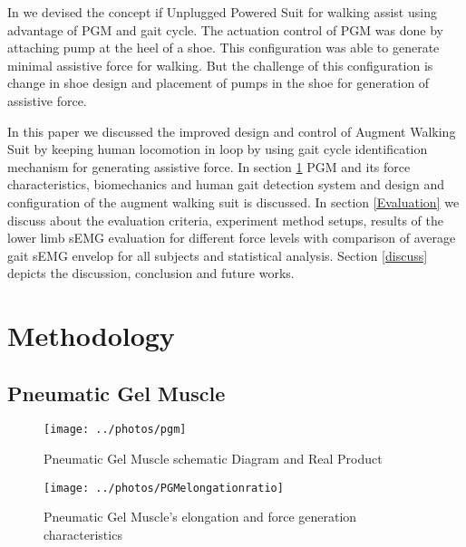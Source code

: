 \documentclass[letterpaper, 10 pt, conference]{ieeeconf}  %
\begin{document}
In \cite{9} we devised the concept if Unplugged Powered Suit for walking assist using advantage of PGM and gait cycle. The actuation control of PGM was done by attaching pump at the heel of a shoe. This configuration was able to generate minimal assistive force for walking. But the challenge of this configuration is change in shoe design and placement of pumps in the shoe for generation of assistive force. 

In this paper we discussed the improved design and control of Augment Walking Suit by keeping human locomotion in loop by using gait cycle identification mechanism for generating assistive force. In section \ref{methodology} PGM and its force characteristics, biomechanics and human gait detection system and design and configuration of the augment walking suit is discussed. In section \ref{Evaluation} we discuss about the evaluation criteria, experiment method setups, results of the lower limb sEMG evaluation for different force levels with comparison of average gait sEMG envelop for all subjects and statistical analysis. Section \ref{discuss} depicts the discussion, conclusion and future works. 

\section{Methodology} \label{methodology}

\subsection{Pneumatic Gel Muscle} \label{pgm}
\begin{figure}
	\centering
	\texttt{[image: ../photos/pgm]}
	\caption{Pneumatic Gel Muscle schematic Diagram and Real Product}
	\label{fig:pgm}
\end{figure}
\begin{figure}
	\centering
	\texttt{[image: ../photos/PGMelongationratio]}
	\caption{Pneumatic Gel Muscle's elongation and force generation characteristics \cite{7}}
	\label{fig:pgmelongationratio}
\end{figure}
\end{document}
